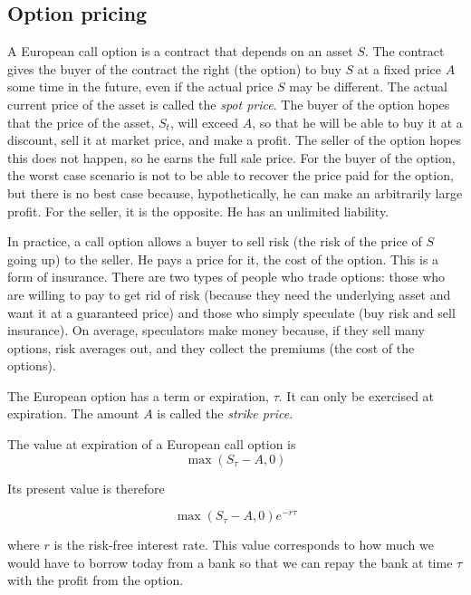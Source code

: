 \documentclass[justified,sixbynine]{tufte-book}
\theoremstyle{plain}%
\theoremstyle{definition}
\theoremstyle{remark}
\begin{document}
\begin{fullwidth}
\goodbreak\section{Option pricing}

A European call option is a contract that depends on an asset $S$. The contract gives the buyer of the contract the right (the option) to buy $S$ at a fixed price $A$ some time in the future, even if the actual price $S$ may be different. The actual current price of the asset is called the {\it spot price}. The buyer of the option hopes that the price of the asset, $S_t$, will exceed $A$, so that he will be able to buy it at a discount, sell it at market price, and make a profit. The seller of the option hopes this does not happen, so he earns the full sale price. For the buyer of the option, the worst case scenario is not to be able to recover the price paid for the option, but there is no best case because, hypothetically, he can make an arbitrarily large profit. For the seller, it is the opposite. He has an unlimited liability.

In practice, a call option allows a buyer to sell risk (the risk of the price of $S$ going up) to the seller. He pays a price for it, the cost of the option. This is a form of insurance. There are two types of people who trade options: those who are willing to pay to get rid of risk (because they need the underlying asset and want it at a guaranteed price) and those who simply speculate (buy risk and sell insurance). On average, speculators make money because, if they sell many options, risk averages out, and they collect the premiums (the cost of the options).

The European option has a term or expiration, $\tau$. It can only be exercised at expiration. The amount $A$ is called the {\it strike price}.

The value at expiration of a European call option is
\begin{equation}
\max (S_\tau -A,0)
\end{equation}

Its present value is therefore

\begin{equation}
\max (S_\tau -A,0) e^{-r\tau}
\end{equation}

where $r$ is the risk-free interest rate. This value corresponds to how much we would have to borrow today from a bank so that we can repay the bank at time $\tau$ with the profit from the option.


\end{fullwidth}
\end{document}

